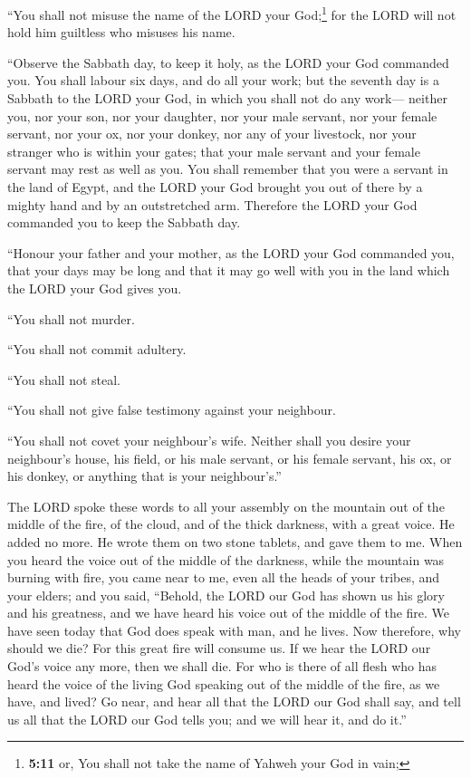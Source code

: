  ``You shall not misuse the name of the LORD your
God;\footnote{\textbf{5:11} or, You shall not take the name of Yahweh
  your God in vain;} for the LORD will not hold him guiltless who
misuses his name.

 ``Observe the Sabbath day, to keep it holy, as the LORD
your God commanded you.  You shall labour six days, and
do all your work;  but the seventh day is a Sabbath to
the LORD your God, in which you shall not do any work--- neither you,
nor your son, nor your daughter, nor your male servant, nor your female
servant, nor your ox, nor your donkey, nor any of your livestock, nor
your stranger who is within your gates; that your male servant and your
female servant may rest as well as you.  You shall
remember that you were a servant in the land of Egypt, and the LORD your
God brought you out of there by a mighty hand and by an outstretched
arm. Therefore the LORD your God commanded you to keep the Sabbath day.

 ``Honour your father and your mother, as the LORD your
God commanded you, that your days may be long and that it may go well
with you in the land which the LORD your God gives you.

 ``You shall not murder.

 ``You shall not commit adultery.

 ``You shall not steal.

 ``You shall not give false testimony against your
neighbour.

 ``You shall not covet your neighbour's wife. Neither
shall you desire your neighbour's house, his field, or his male servant,
or his female servant, his ox, or his donkey, or anything that is your
neighbour's.''

 The LORD spoke these words to all your assembly on the
mountain out of the middle of the fire, of the cloud, and of the thick
darkness, with a great voice. He added no more. He wrote them on two
stone tablets, and gave them to me.  When you heard the
voice out of the middle of the darkness, while the mountain was burning
with fire, you came near to me, even all the heads of your tribes, and
your elders;  and you said, ``Behold, the LORD our God
has shown us his glory and his greatness, and we have heard his voice
out of the middle of the fire. We have seen today that God does speak
with man, and he lives.  Now therefore, why should we
die? For this great fire will consume us. If we hear the LORD our God's
voice any more, then we shall die.  For who is there of
all flesh who has heard the voice of the living God speaking out of the
middle of the fire, as we have, and lived?  Go near, and
hear all that the LORD our God shall say, and tell us all that the LORD
our God tells you; and we will hear it, and do it.''

